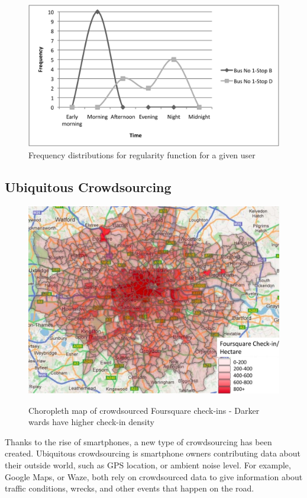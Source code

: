 \documentclass{sig-alternate-05-2015}
\begin{document}
	\begin{figure}
		\includegraphics[width=\linewidth]{freq-dist}
		\caption{Frequency distributions for regularity function for a given user}
		\label{fig-freq}
	\end{figure}

	\subsection{Ubiquitous Crowdsourcing}
	\begin{figure}[h]
		\centering \includegraphics[width=\columnwidth]{foursquare}
		\label{fig-foursquare}
		\caption{Choropleth map of crowdsourced Foursquare check-ins - Darker wards have higher check-in density \cite{mashhadi2013putting}}
	\end{figure}
	Thanks to the rise of smartphones, a new type of crowdsourcing has been created. Ubiquitous crowdsourcing is smartphone owners contributing data about their outside world, such as GPS location, or ambient noise level. For example, Google Maps, or Waze, both rely on crowdsourced data to give information about traffic conditions, wrecks, and other events that happen on the road. 
	
\end{document}
